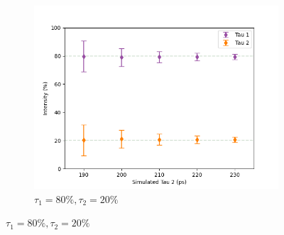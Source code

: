 \begin{figure}[p]
\begin{subfigure}{0.7\textwidth}
        \includegraphics[width=.95\textwidth]{Batch 3/regular IRF/tau1 150/output/8020r.png}
        \caption{$\tau_1 = 80\%, \tau_2 = 20\%$}
        \label{fig:150-8020}
    \end{subfigure}
    \label{fig:150}
\end{figure}

